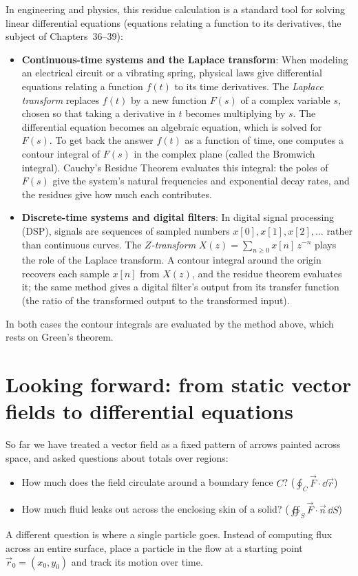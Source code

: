 In engineering and physics, this residue calculation is a standard tool for solving linear differential equations (equations relating a function to its derivatives, the subject of Chapters~36--39):
\begin{itemize}
\item \textbf{Continuous-time systems and the Laplace transform}: When modeling an electrical circuit or a vibrating spring, physical laws give differential equations relating a function $f(t)$ to its time derivatives. The \emph{Laplace transform} replaces $f(t)$ by a new function $F(s)$ of a complex variable $s$, chosen so that taking a derivative in $t$ becomes multiplying by $s$. The differential equation becomes an algebraic equation, which is solved for $F(s)$. To get back the answer $f(t)$ as a function of time, one computes a contour integral of $F(s)$ in the complex plane (called the Bromwich integral). Cauchy's Residue Theorem evaluates this integral: the poles of $F(s)$ give the system's natural frequencies and exponential decay rates, and the residues give how much each contributes.
\item \textbf{Discrete-time systems and digital filters}: In digital signal processing (DSP), signals are sequences of sampled numbers $x[0], x[1], x[2], \dots$ rather than continuous curves. The \emph{$Z$-transform} $X(z) = \sum_{n\ge 0} x[n]\,z^{-n}$ plays the role of the Laplace transform. A contour integral around the origin recovers each sample $x[n]$ from $X(z)$, and the residue theorem evaluates it; the same method gives a digital filter's output from its transfer function (the ratio of the transformed output to the transformed input).
\end{itemize}
In both cases the contour integrals are evaluated by the method above, which rests on Green's theorem.

\section{Looking forward: from static vector fields to differential equations}
\label{ch35:bridge-ode}

So far we have treated a vector field as a fixed pattern of arrows painted across
space, and asked questions about totals over regions:
\begin{itemize}
\item How much does the field circulate around a boundary fence $C$?
  ($\oint_C \vec F \cdot \dd\vec r$)
\item How much fluid leaks out across the enclosing skin of a solid?
  ($\oiint_S \vec F \cdot \vec n\,\dd S$)
\end{itemize}
A different question is where a single particle goes. Instead of computing
flux across an entire surface, place a particle in the flow at
a starting point $\vec r_0 = (x_0, y_0)$ and track its motion over time.

